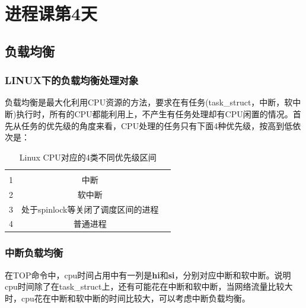 


\part{进程课第4天}


\chapter{负载均衡}
\section{LINUX下的负载均衡处理对象}
负载均衡是最大化利用CPU资源的方法，要求在有任务(task\_struct，中断，软中断)执行时，所有的CPU都能利用上，不产生有任务处理却有CPU闲置的情况。首先从任务的优先级的角度来看，CPU处理的任务只有下面4种优先级，按高到低依次是：


\begin{table}[!htbp]
\stabbox{3.0cm}
{\caption{Linux CPU对应的4类不同优先级区间}\label{linux_pri_4type_table}}
{\begin{tabular*}{\cflwidth}{@{\hspace{5pt}}@{\extracolsep{\fill}}*{3}{@{\hspace{-3pt}}c}}
     &               \\
    1 & 中断                 \\
    2 & 软中断                  \\
    3 & 处于spinlock等关闭了调度区间的进程                   \\
    4 & 普通进程                  \\
\end{tabular*}
}
\end{table}

\section{中断负载均衡}
在TOP命令中，cpu时间占用中有一列是\textbf{hi}和\textbf{si}，分别对应中断和软中断。说明cpu时间除了在task\_struct上，还有可能花在中断和软中断，当网络流量比较大时，cpu花在中断和软中断的时间比较大，可以考虑中断负载均衡。\\


